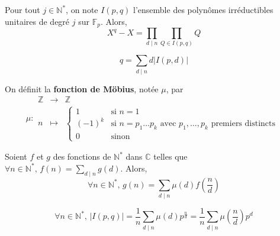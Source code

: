 	\begin{theorem}
		Pour tout $j \in \mathbb{N}^*$, on note $I(p,q)$ l'ensemble des polynômes irréductibles unitaires de degré $j$ sur $\mathbb{F}_p$. Alors,
		\[ X^q - X = \prod_{d \mid n} \prod_{Q \in I(p,q)} Q \]
	\end{theorem}

	\begin{corollary}
		\[ q = \sum_{d \mid n} d \vert I(p,d) \vert \]
	\end{corollary}

	\begin{definition}
		On définit la \textbf{fonction de Möbius}, notée $\mu$, par
		\[
			\mu :
			\begin{array}{ccc}
				\mathbb{Z} &\rightarrow& \mathbb{Z} \\
				n &\mapsto& \begin{cases}
					1 &\text{si } n = 1 \\
					(-1)^k &\text{si } n = p_1 \dots p_k \text{ avec } p_1, \dots, p_k \text{ premiers distincts} \\
					0 &\text{sinon}
				\end{cases}
			\end{array}
		\]
	\end{definition}

	\begin{theorem}
		Soient $f$ et $g$ des fonctions de $\mathbb{N}^*$ dans $\mathbb{C}$ telles que $\forall n \in \mathbb{N}^*, \, f(n) = \sum_{d \mid n} g(d)$. Alors,
		\[ \forall n \in \mathbb{N}^*, \, g(n) = \sum_{d \mid n} \mu(d) f \left( \frac{n}{d} \right) \]
	\end{theorem}

	\begin{corollary}
		\[ \forall n \in \mathbb{N}^*, \, \vert I(p,q) \vert = \frac{1}{n} \sum_{d \mid n} \mu(d) p^{\frac{n}{d}} = \frac{1}{n} \sum_{d \mid n} \mu \left( \frac{n}{d} \right) p^{d} \]
	\end{corollary}

